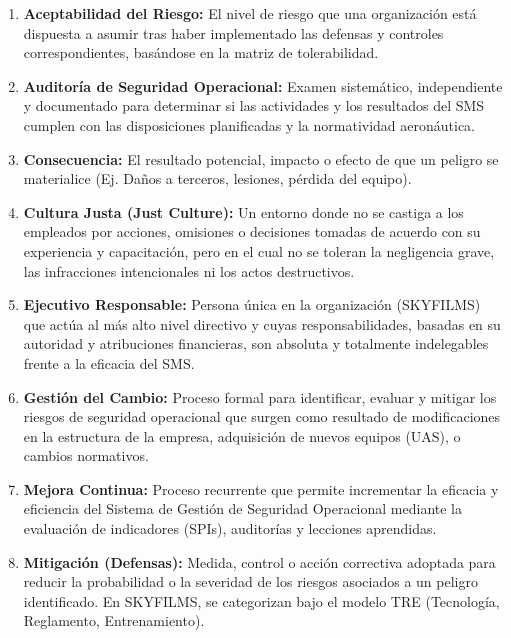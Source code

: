 \begin{enumerate}
    \item \textbf{Aceptabilidad del Riesgo:} El nivel de riesgo que una organización está dispuesta a asumir tras haber implementado las defensas y controles correspondientes, basándose en la matriz de tolerabilidad.

    \item \textbf{Auditoría de Seguridad Operacional:} Examen sistemático, independiente y documentado para determinar si las actividades y los resultados del SMS cumplen con las disposiciones planificadas y la normatividad aeronáutica.

    \item \textbf{Consecuencia:} El resultado potencial, impacto o efecto de que un peligro se materialice (Ej. Daños a terceros, lesiones, pérdida del equipo).

    \item \textbf{Cultura Justa (Just Culture):} Un entorno donde no se castiga a los empleados por acciones, omisiones o decisiones tomadas de acuerdo con su experiencia y capacitación, pero en el cual no se toleran la negligencia grave, las infracciones intencionales ni los actos destructivos.

    \item \textbf{Ejecutivo Responsable:} Persona única en la organización (SKYFILMS) que actúa al más alto nivel directivo y cuyas responsabilidades, basadas en su autoridad y atribuciones financieras, son absoluta y totalmente indelegables frente a la eficacia del SMS.

    \item \textbf{Gestión del Cambio:} Proceso formal para identificar, evaluar y mitigar los riesgos de seguridad operacional que surgen como resultado de modificaciones en la estructura de la empresa, adquisición de nuevos equipos (UAS), o cambios normativos.

    \item \textbf{Mejora Continua:} Proceso recurrente que permite incrementar la eficacia y eficiencia del Sistema de Gestión de Seguridad Operacional mediante la evaluación de indicadores (SPIs), auditorías y lecciones aprendidas.

    \item \textbf{Mitigación (Defensas):} Medida, control o acción correctiva adoptada para reducir la probabilidad o la severidad de los riesgos asociados a un peligro identificado. En SKYFILMS, se categorizan bajo el modelo TRE (Tecnología, Reglamento, Entrenamiento).


\end{enumerate}

